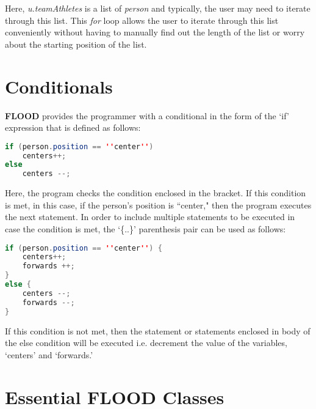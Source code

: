 \documentclass[12pt]{report}
\begin{document}
\begin{doublespace}
Here, \textit{u.teamAthletes} is a list of \textit{person} and typically, the user may need to iterate through this list. This \textit{for} loop allows the user to iterate through this list conveniently without having to manually find out the length of the list or worry about the starting position of the list.
\end{doublespace}

\section{Conditionals}

\begin{doublespace}
\textbf{FLOOD} provides the programmer with a conditional in the form of the `if' expression that is defined as follows:
\end{doublespace}

\begin{lstlisting}[language=Java,label=some-code,caption=While loop]
if (person.position == ''center'')
	centers++;
else
	centers --;
\end{lstlisting}

\begin{doublespace}
Here, the program checks the condition enclosed in the bracket. If this condition is met, in this case, if the person's position is ``center," then the program executes the next statement. In order to include multiple statements to be executed in case the condition is met, the `\{..\}'
parenthesis pair can be used as follows:
\end{doublespace}

\begin{lstlisting}[language=Java,label=some-code,caption=While loop]
if (person.position == ''center'') {
	centers++;
	forwards ++;
}
else {
	centers --;
	forwards --;
}
\end{lstlisting}

\begin{doublespace}
If this condition is not met, then the statement or statements enclosed in body of the else condition will be executed i.e. decrement the value of the variables, `centers' and `forwards.'
\end{doublespace}

\section{Essential FLOOD Classes}
\end{document}
